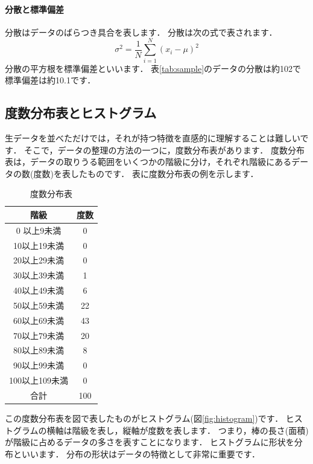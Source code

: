 \documentclass[12pt, a4j]{jreport}
\begin{document}
\paragraph{分散と標準偏差}
分散はデータのばらつき具合を表します．
分散は次の式で表されます．
\begin{equation}
    \sigma^2 = \frac{1}{N} \sum_{i=1}^{N} (x_i - \mu)^2
\end{equation}
分散の平方根を標準偏差といいます．
表\ref{tab:sample}のデータの分散は約102で標準偏差は約10.1です．

\subsection{度数分布表とヒストグラム}

生データを並べただけでは，それが持つ特徴を直感的に理解することは難しいです．
そこで，データの整理の方法の一つに，度数分布表があります．
度数分布表は，データの取りうる範囲をいくつかの階級に分け，それぞれ階級にあるデータの数(度数)を表したものです．
表に度数分布表の例を示します．

\begin{table}[htb]
    \centering
    \caption{度数分布表}
    \begin{tabular}{c|c}
     階級         & 度数 \\ \hline
     0 以上9未満   & 0 \\
     10以上19未満  & 0 \\
     20以上29未満  & 0 \\
     30以上39未満  & 1 \\
     40以上49未満  & 6 \\
     50以上59未満  & 22\\
     60以上69未満  & 43\\
     70以上79未満  & 20\\
     80以上89未満  & 8 \\
     90以上99未満  & 0 \\
     100以上109未満& 0 \\
     合計          & 100
    \end{tabular}
    \label{tab:hist}
\end{table}

この度数分布表を図で表したものがヒストグラム(図\ref{fig:histogram})です．
ヒストグラムの横軸は階級を表し，縦軸が度数を表します．
つまり，棒の長さ(面積)が階級に占めるデータの多さを表すことになります．
ヒストグラムに形状を分布といいます．
分布の形状はデータの特徴として非常に重要です．
\end{document}
